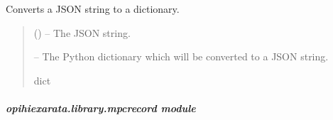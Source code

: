 \documentclass[letterpaper,11pt,english]{sphinxmanual}
\begin{document}
\begin{savenotes}\begin{fulllineitems}
\label{\detokenize{code/opihiexarata.library.json:opihiexarata.library.json.json_to_dictionary}}
\pysigstartsignatures
{}
\pysigstopsignatures
\sphinxAtStartPar
Converts a JSON string to a dictionary.
\begin{quote}\begin{description}
\sphinxAtStartPar
{} () – The JSON string.

\sphinxAtStartPar
{} – The Python dictionary which will be converted to a JSON string.

\sphinxAtStartPar
dict

\end{description}\end{quote}

\end{fulllineitems}\end{savenotes}


\sphinxstepscope


\subparagraph{opihiexarata.library.mpcrecord module}
\label{\detokenize{code/opihiexarata.library.mpcrecord:module-opihiexarata.library.mpcrecord}}\label{\detokenize{code/opihiexarata.library.mpcrecord:opihiexarata-library-mpcrecord-module}}\label{\detokenize{code/opihiexarata.library.mpcrecord::doc}}
\end{document}

